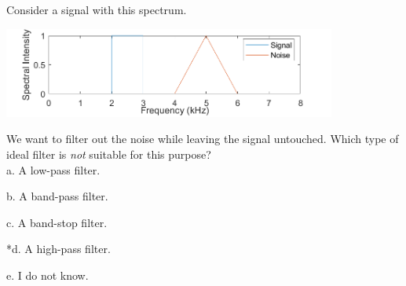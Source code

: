 
Consider a signal with this spectrum.

\includegraphics[width=4.3155in,height=1.16807in]{../../Images/FilteringQ2.png}

We want to filter out the noise while leaving the signal untouched. Which type of ideal filter is \emph{not} suitable for this purpose?\\

a. A low-pass filter.

b. A band-pass filter.

c. A band-stop filter.

*d. A high-pass filter.

e. I do not know.\\
